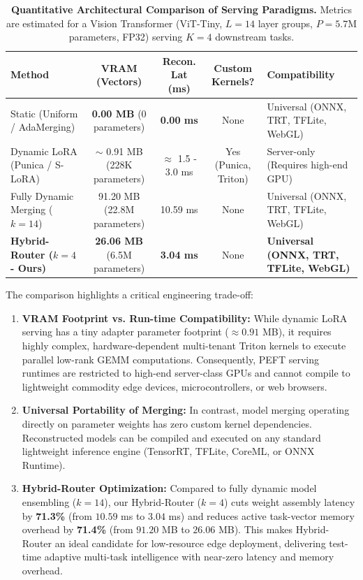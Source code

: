 \begin{table}[t]
\caption{\textbf{Quantitative Architectural Comparison of Serving Paradigms.} Metrics are estimated for a Vision Transformer (ViT-Tiny, $L=14$ layer groups, $P = 5.7$M parameters, FP32) serving $K=4$ downstream tasks.}
\label{tab:paradigm_comparison}
\vskip 0.15in
\begin{center}
\begin{scriptsize}
\setlength{\tabcolsep}{1.8pt}
\begin{tabular}{lcccp{3.5cm}}
\toprule
Method & VRAM (Vectors) & Recon. Lat (ms) & Custom Kernels? & Compatibility \\
\midrule
Static (Uniform / AdaMerging) & \textbf{0.00 MB} (0 parameters) & \textbf{0.00 ms} & None & Universal (ONNX, TRT, TFLite, WebGL) \\
Dynamic LoRA (Punica / S-LoRA) & $\sim$ 0.91 MB (228K parameters) & $\approx$ 1.5 - 3.0 ms & Yes (Punica, Triton) & Server-only (Requires high-end GPU) \\
Fully Dynamic Merging ($k = 14$) & 91.20 MB (22.8M parameters) & 10.59 ms & None & Universal (ONNX, TRT, TFLite, WebGL) \\
\textbf{Hybrid-Router ($k = 4$ - Ours)} & \textbf{26.06 MB} (6.5M parameters) & \textbf{3.04 ms} & None & \textbf{Universal (ONNX, TRT, TFLite, WebGL)} \\
\bottomrule
\end{tabular}
\end{scriptsize}
\end{center}
\vskip -0.1in
\end{table}

The comparison highlights a critical engineering trade-off:
\begin{enumerate}
    \item \textbf{VRAM Footprint vs. Run-time Compatibility:} While dynamic LoRA serving has a tiny adapter parameter footprint ($\approx 0.91$ MB), it requires highly complex, hardware-dependent multi-tenant Triton kernels to execute parallel low-rank GEMM computations. Consequently, PEFT serving runtimes are restricted to high-end server-class GPUs and cannot compile to lightweight commodity edge devices, microcontrollers, or web browsers. 
    \item \textbf{Universal Portability of Merging:} In contrast, model merging operating directly on parameter weights has zero custom kernel dependencies. Reconstructed models can be compiled and executed on any standard lightweight inference engine (TensorRT, TFLite, CoreML, or ONNX Runtime).
    \item \textbf{Hybrid-Router Optimization:} Compared to fully dynamic model ensembling ($k=14$), our Hybrid-Router ($k=4$) cuts weight assembly latency by \textbf{71.3\%} (from $10.59$ ms to $3.04$ ms) and reduces active task-vector memory overhead by \textbf{71.4\%} (from $91.20$ MB to $26.06$ MB). This makes Hybrid-Router an ideal candidate for low-resource edge deployment, delivering test-time adaptive multi-task intelligence with near-zero latency and memory overhead.
\end{enumerate}


